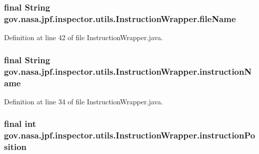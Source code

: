 \subsubsection[{\texorpdfstring{file\+Name}{fileName}}]{\setlength{\rightskip}{0pt plus 5cm}final String gov.\+nasa.\+jpf.\+inspector.\+utils.\+Instruction\+Wrapper.\+file\+Name\hspace{0.3cm}{\ttfamily [private]}}\hypertarget{classgov_1_1nasa_1_1jpf_1_1inspector_1_1utils_1_1_instruction_wrapper_ac5d8a6508abd8be72ea07f46a553ac71}{}\label{classgov_1_1nasa_1_1jpf_1_1inspector_1_1utils_1_1_instruction_wrapper_ac5d8a6508abd8be72ea07f46a553ac71}


Definition at line 42 of file Instruction\+Wrapper.\+java.

\subsubsection[{\texorpdfstring{instruction\+Name}{instructionName}}]{\setlength{\rightskip}{0pt plus 5cm}final String gov.\+nasa.\+jpf.\+inspector.\+utils.\+Instruction\+Wrapper.\+instruction\+Name\hspace{0.3cm}{\ttfamily [private]}}\hypertarget{classgov_1_1nasa_1_1jpf_1_1inspector_1_1utils_1_1_instruction_wrapper_afff7ff26a868cf2a4b77abdb080e028b}{}\label{classgov_1_1nasa_1_1jpf_1_1inspector_1_1utils_1_1_instruction_wrapper_afff7ff26a868cf2a4b77abdb080e028b}


Definition at line 34 of file Instruction\+Wrapper.\+java.

\subsubsection[{\texorpdfstring{instruction\+Position}{instructionPosition}}]{\setlength{\rightskip}{0pt plus 5cm}final int gov.\+nasa.\+jpf.\+inspector.\+utils.\+Instruction\+Wrapper.\+instruction\+Position\hspace{0.3cm}{\ttfamily [private]}}\hypertarget{classgov_1_1nasa_1_1jpf_1_1inspector_1_1utils_1_1_instruction_wrapper_a78cea7c9d35c83e0fa1cbbc13022725d}{}\label{classgov_1_1nasa_1_1jpf_1_1inspector_1_1utils_1_1_instruction_wrapper_a78cea7c9d35c83e0fa1cbbc13022725d}


